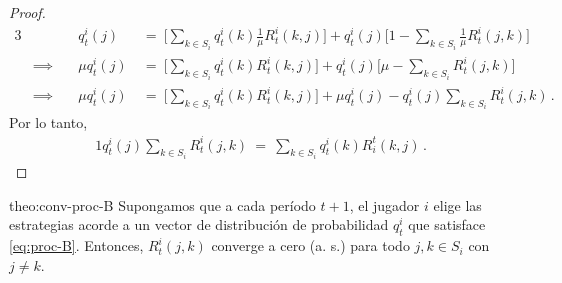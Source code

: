 \begin{proof}
\begin{alignat}{3}
  & & q^i_t(j)\ &=\ \biggl[\sum_{k \in S_i} q^i_t(k)\frac{1}{\mu}R^i_t(k,j)\biggr] + q^i_t(j)\biggl[1 - \sum_{k \in S_i} \frac{1}{\mu} R^i_t(j,k)\biggr] \\
  &\implies\quad
  &\mu q_t^i(j)\ &=\ \biggl[\sum_{k \in S_i}q^i_t(k)R^i_t(k,j)\biggr] + q^i_t(j)\biggl[\mu - \sum_{k \in S_i} R^i_t(j, k)\biggr] \\
  &\implies\quad
  &\mu q^i_t(j)\ & =\ \biggl[\sum_{k \in S_i}q^i_t(k)R^i_t(k,j)\biggr] + \mu q^i_t(j) - q^i_t(j)\sum_{k\in S_i} R^i_t(j,k) \,.
\end{alignat}
Por lo tanto,
\begin{alignat}{1}
q^i_t(j)\sum_{k \in S_i} R^i_t(j,k)\ =\ \sum_{k \in S_i} q_t^i(k)R_i^t(k,j) \,.
\end{alignat}
\end{proof}

\begin{reptheorem}{theo:conv-proc-B}
Supongamos que a cada período $t+1$, el jugador $i$ elige las estrategias acorde a un vector de distribución de probabilidad $q_t^i$ que satisface \eqref{eq:proc-B}. Entonces, $R^i_t(j, k)$ converge a cero (a. s.) para todo $j, k \in S_i$ con $j \neq k$.
\end{reptheorem}

